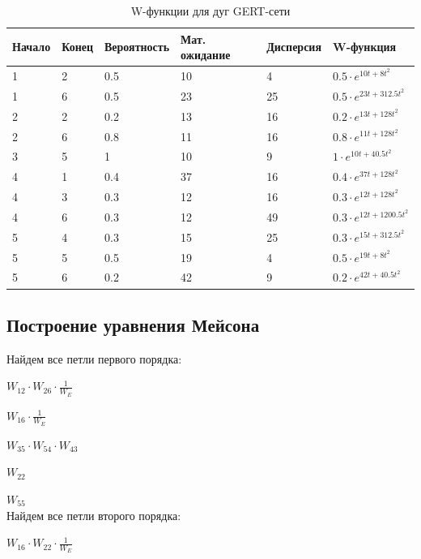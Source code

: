 \begin{table}[h!]
	\centering
	\bgroup
	\captionsetup{singlelinecheck = false, format= hang, justification=raggedleft, font=footnotesize, labelsep=space}
	\caption{W-функции для дуг GERT-сети}
	\def\arraystretch{1}
	\begin{tabular}{ | m{1.4cm} | m{1.4cm} | m{2.2cm} | m{2.8cm} | m{2.0cm} | m{2.8cm} | }
		\hline
		Начало & Конец & Вероятность & Мат. ожидание & Дисперсия & W-функция \\ \hline
		1 & 2 & 0.5 & 10 & 4 & $0.5\cdot e^{10t+8t^2}$ \\ \hline
		1 & 6 & 0.5 & 23 & 25 & $0.5\cdot e^{23t+312.5t^2}$ \\ \hline
		2 & 2 & 0.2 & 13 & 16 & $0.2\cdot e^{13t+128t^2}$ \\ \hline
		2 & 6 & 0.8 & 11 & 16 & $0.8\cdot e^{11t+128t^2}$ \\ \hline
		3 & 5 & 1 & 10 & 9 & $1\cdot e^{10t+40.5t^2}$ \\ \hline
		4 & 1 & 0.4 & 37 & 16 & $0.4\cdot e^{37t+128t^2}$ \\ \hline
		4 & 3 & 0.3 & 12 & 16 & $0.3\cdot e^{12t+128t^2}$ \\ \hline
		4 & 6 & 0.3 & 12 & 49 & $0.3\cdot e^{12t+1200.5t^2}$ \\ \hline
		5 & 4 & 0.3 & 15 & 25 & $0.3\cdot e^{15t+312.5t^2}$ \\ \hline
		5 & 5 & 0.5 & 19 & 4 & $0.5\cdot e^{19t+8t^2}$ \\ \hline
		5 & 6 & 0.2 & 42 & 9 & $0.2\cdot e^{42t+40.5t^2}$ \\
		\hline
	\end{tabular}
	
	\egroup
\end{table}

\subsection{Построение уравнения Мейсона}

Найдем все петли первого порядка:

$W_{12}\cdot W_{26}\cdot \frac{1}{W_E}$

$W_{16}\cdot \frac{1}{W_E}$

$W_{35}\cdot W_{54}\cdot W_{43}$

$W_{22}$

$W_{55}$\\

Найдем все петли второго порядка:

$W_{16}\cdot W_{22}\cdot \frac{1}{W_E}$

